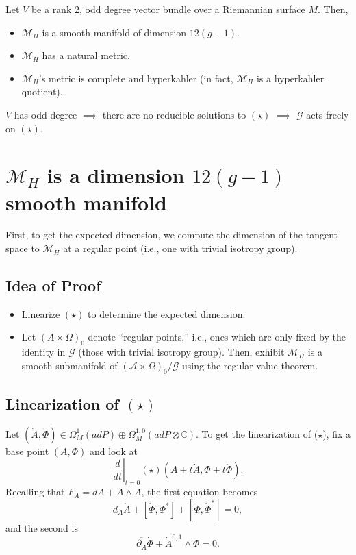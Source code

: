 Let $V$ be a rank 2, odd degree vector bundle over a Riemannian surface
$M$. Then,
\begin{itemize}
\item $\mathcal{M}_{H}$ is a smooth manifold of dimension $12\left(g-1\right)$.
\item $\mathcal{M}_{H}$ has a natural metric.
\item $\mathcal{M}_{H}$'s metric is complete and hyperkahler (in fact,
$\mathcal{M}_{H}$ is a hyperkahler quotient).\end{itemize}
\begin{rem*}
$V$ has odd degree $\implies$ there are no reducible solutions to
$\left(\star\right)$ $\implies$ $\mathcal{G}$ acts freely on $\left(\star\right)$.
\end{rem*}

\section{$\mathcal{M}_{H}$ is a dimension $12\left(g-1\right)$ smooth manifold}

First, to get the expected dimension, we compute the dimension of
the tangent space to $\mathcal{M}_{H}$ at a regular point (i.e.,
one with trivial isotropy group).


\subsection{Idea of Proof}
\begin{itemize}
\item Linearize $(\star)$ to determine the expected dimension.
\item Let $\left(A\times\Omega\right)_{0}$ denote ``regular points,''
i.e., ones which are only fixed by the identity in $\mathcal{G}$
(those with trivial isotropy group). Then, exhibit $\mathcal{M}_{H}$
is a smooth submanifold of $\left(\mathcal{A}\times\Omega\right)_{0}/\mathcal{G}$
using the regular value theorem.
\end{itemize}

\subsection{Linearization of $(\star)$}

Let $\left(\dot{A},\dot{\Phi}\right)\in\Omega_{M}^{1}\left(adP\right)\oplus\Omega_{M}^{1,0}\left(adP\otimes\mathbb{C}\right)$.
To get the linearization of $(\star$), fix a base point $\left(A,\Phi\right)$
and look at
\[
\left.\frac{d}{dt}\right|_{t=0}\left(\star\right)\left(A+t\dot{A},\Phi+t\dot{\Phi}\right).
\]
Recalling that $F_{A}=dA+A\wedge A$, the first equation becomes
\[
d_{A}\dot{A}+\left[\dot{\Phi},\Phi^{*}\right]+\left[\Phi,\dot{\Phi}^{*}\right]=0,
\]
and the second is
\[
\overline{\partial_{A}}\dot{\Phi}+\dot{A}^{0,1}\wedge\Phi=0.
\]


